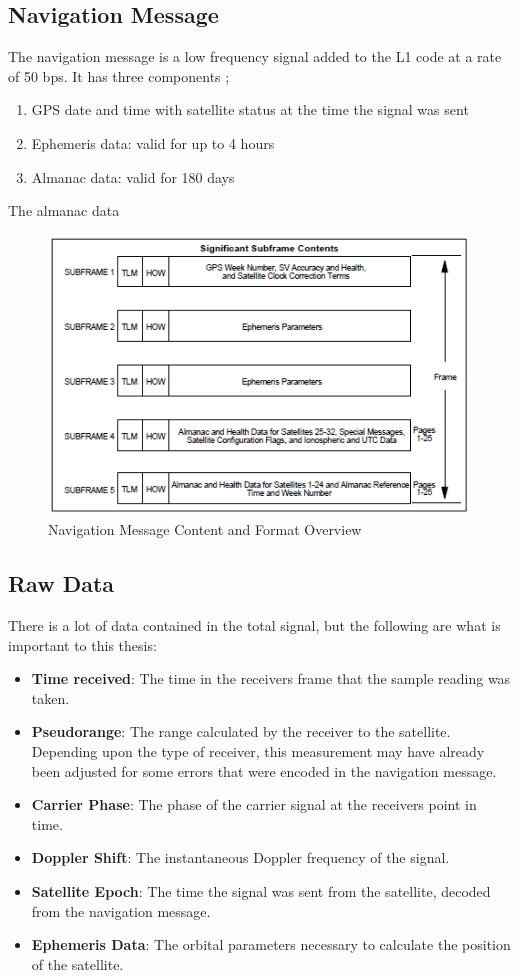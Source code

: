 \subsection{Navigation Message}
The navigation message is a low frequency signal added to the L1 code at a rate of 50 bps. It has three components \cite{signalspec};
\begin{enumerate}
\item GPS date and time with satellite status at the time the signal was sent
\item Ephemeris data: valid for up to 4 hours
\item Almanac data: valid for 180 days
\end{enumerate}
The almanac data 


\begin{figure}
\centering
\caption{Navigation Message Content and Format Overview \cite{signalspec}}
\label{fig:NavMessage}
\includegraphics[width=0.7\linewidth]{ChapterLiteratureReview/NavMessage}
\end{figure}



\subsection{Raw Data}
There is a lot of data contained in the total signal, but the following are what is important to this thesis:
\begin{itemize}
	\item \textbf{Time received}: The time in the receivers frame that the sample reading was taken.
	\item \textbf{Pseudorange}: The range calculated by the receiver to the satellite. Depending upon the type of receiver, this measurement may have already been adjusted for some errors that were encoded in the navigation message.
	\item \textbf{Carrier Phase}: The phase of the carrier signal at the receivers point in time.
	\item \textbf{Doppler Shift}: The instantaneous Doppler frequency of the signal. 
	\item \textbf{Satellite Epoch}: The time the signal was sent from the satellite, decoded from the navigation message.
	\item \textbf{Ephemeris Data}: The orbital parameters necessary to calculate the position of the satellite.
\end{itemize}


